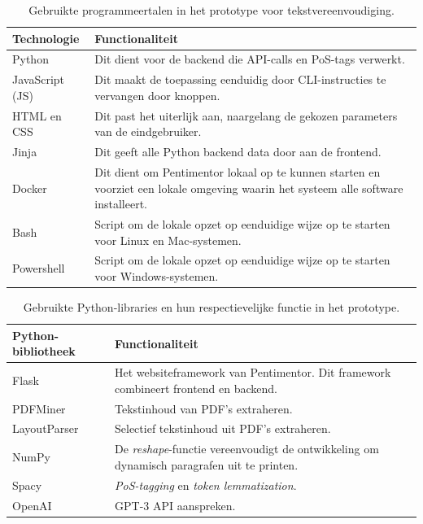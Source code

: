 \begin{center}
	\begin{table}[H]
	\begin{tabular}{ | m{4cm} | m{11cm} | } 
		\hline
		\textbf{Technologie} 	& \textbf{Functionaliteit} \\
		\hline
		Python 					& Dit dient voor de backend die API-calls en PoS-tags verwerkt. \\
		\hline
		JavaScript (JS)			& Dit maakt de toepassing eenduidig door CLI-instructies te vervangen door knoppen. \\
		\hline
		HTML en CSS 			& Dit past het uiterlijk aan, naargelang de gekozen parameters van de eindgebruiker. \\
		\hline
		Jinja 					& Dit geeft alle Python backend data door aan de frontend.  \\
		\hline
		Docker 					& Dit dient om Pentimentor lokaal op te kunnen starten en voorziet een lokale omgeving waarin het systeem alle software installeert. \\
		\hline
		Bash					& Script om de lokale opzet op eenduidige wijze op te starten voor Linux en Mac-systemen. \\
		\hline
		Powershell 				& Script om de lokale opzet op eenduidige wijze op te starten voor Windows-systemen. \\
		\hline
	\end{tabular}
	\caption{Gebruikte programmeertalen in het prototype voor tekstvereenvoudiging.}
	\label{table:technologies}
	\end{table}
\end{center}

\begin{center}
	\begin{table}[H]
	\begin{tabular}{ | m{4cm} | m{11cm} | } 
		\hline
		\textbf{Python-bibliotheek} & \textbf{Functionaliteit} \\
		\hline
		Flask					& Het websiteframework van Pentimentor. Dit framework combineert frontend en backend. \\ 
		\hline
		PDFMiner 				& Tekstinhoud van PDF's extraheren. \\ 
		\hline
		LayoutParser			& Selectief tekstinhoud uit PDF's extraheren. \\
		\hline
		NumPy 					& De \textit{reshape}-functie vereenvoudigt de ontwikkeling om dynamisch paragrafen uit te printen. \\
		\hline		
		Spacy 					& \textit{PoS-tagging} en \textit{token lemmatization}. \\
		\hline
		OpenAI					& GPT-3 API aanspreken. \\
		\hline
	\end{tabular}
	\caption{Gebruikte Python-libraries en hun respectievelijke functie in het prototype.}
	\label{table:python-libraries}
	\end{table}
\end{center}

